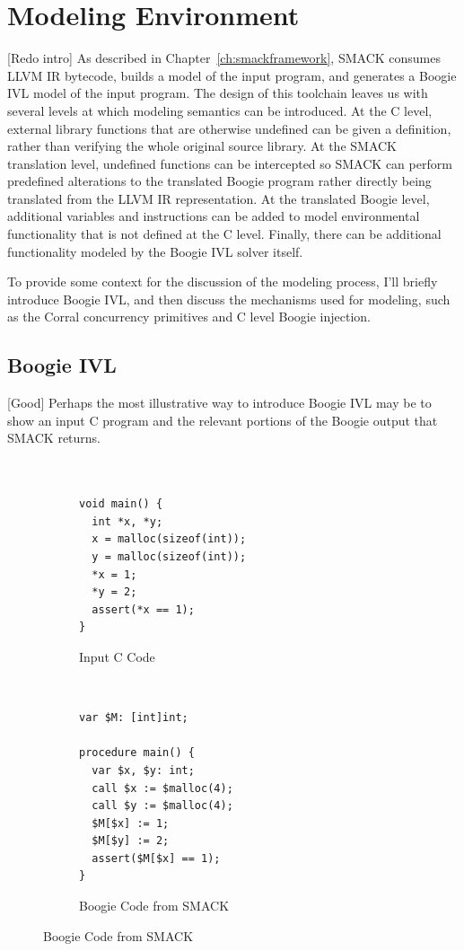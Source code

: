 \section{Modeling Environment}\label{sec:modelingenvironment}
[Redo intro]
As described in Chapter~\ref{ch:smackframework}, SMACK consumes LLVM IR
bytecode, builds a model of the input program, and generates a Boogie
IVL model of the input program.  The design of this toolchain leaves
us with several levels at which modeling semantics can be introduced.
At the C level, external library functions that are otherwise
undefined can be given a definition, rather than verifying the whole
original source library. At the SMACK translation level, undefined
functions can be intercepted so SMACK can perform predefined
alterations to the translated Boogie program rather directly being
translated from the LLVM IR representation.  At the translated Boogie
level, additional variables and instructions can be added to model
environmental functionality that is not defined at the C level.
Finally, there can be additional functionality modeled by the Boogie
IVL solver itself. 

To provide some context for the discussion of the modeling process,
I'll briefly introduce Boogie IVL, and then discuss the mechanisms
used for modeling, such as the Corral concurrency primitives and C
level Boogie injection.

\subsection{Boogie IVL}
[Good]
Perhaps the most illustrative way to introduce Boogie IVL may be to
show an input C program and the relevant portions of the Boogie output
that SMACK returns.
\begin{figure}[h]
\centering
\caption{SMACK Translation of C Program}\label{fig:cToBoogie}
\begin{subfigure}[b]{.45\textwidth}
\centering
\caption{Input C Code}\label{fig:cToBoogie_a}
\begin{lstlisting}


void main() {
  int *x, *y;
  x = malloc(sizeof(int));
  y = malloc(sizeof(int));
  *x = 1;
  *y = 2;
  assert(*x == 1);
}
\end{lstlisting}
\end{subfigure}
~
\begin{subfigure}[b]{.45\textwidth}
\centering
\caption{Boogie Code from SMACK}\label{fig:cToBoogie_b}
\begin{lstlisting}[language=boogie]
var $M: [int]int;

procedure main() {
  var $x, $y: int;
  call $x := $malloc(4);
  call $y := $malloc(4);
  $M[$x] := 1;
  $M[$y] := 2;
  assert($M[$x] == 1);
}
\end{lstlisting}
\end{subfigure}
\end{figure}

